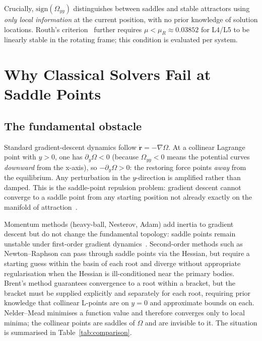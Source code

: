 \documentclass[10pt,twocolumn]{article}
\begin{document}
Crucially, $\text{sign}(\Omega_{yy})$ distinguishes between saddles and stable
attractors using \emph{only local information} at the current position, with no
prior knowledge of solution locations.
Routh's criterion~\cite{routh1875} further requires $\mu<\mu_R\approx0.03852$
for L4/L5 to be linearly stable in the rotating frame; this condition is
evaluated per system.

\section{Why Classical Solvers Fail at Saddle Points}

\subsection{The fundamental obstacle}

Standard gradient-descent dynamics follow $\dot{\mathbf{r}}=-\nabla\Omega$.
At a collinear Lagrange point with $y>0$, one has $\partial_y\Omega<0$
(because $\Omega_{yy}<0$ means the potential curves \emph{downward} from the
x-axis), so $-\partial_y\Omega>0$: the restoring force points \emph{away}
from the equilibrium.
Any perturbation in the $y$-direction is amplified rather than damped.
This is the saddle-point repulsion problem: gradient descent cannot converge to
a saddle point from any starting position not already exactly on the manifold
of attraction~\cite{dauphin2014}.

Momentum methods (heavy-ball, Nesterov, Adam) add inertia to gradient descent
but do not change the fundamental topology: saddle points remain unstable under
first-order gradient dynamics~\cite{jin2017}.
Second-order methods such as Newton--Raphson can pass through saddle points via
the Hessian, but require a starting guess within the basin of each root and
diverge without appropriate regularisation when the Hessian is ill-conditioned
near the primary bodies.
Brent's method guarantees convergence to a root within a bracket, but the
bracket must be supplied explicitly and separately for each root, requiring
prior knowledge that collinear L-points are on $y=0$ and approximate bounds
on each.
Nelder--Mead minimises a function value and therefore converges only to local
minima; the collinear points are saddles of $\Omega$ and are invisible to it.
The situation is summarised in Table~\ref{tab:comparison}.
\end{document}
